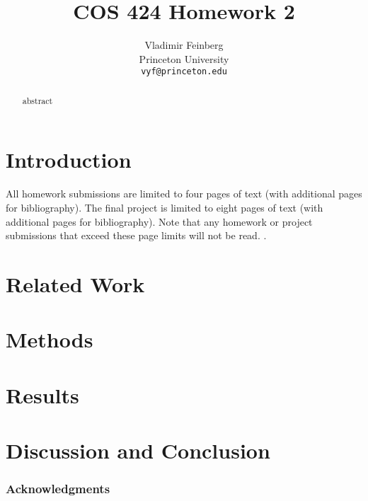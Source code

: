\documentclass{article} %
\title{COS 424 Homework 2}
\author{
Vladimir Feinberg\\
Princeton University\\
\texttt{vyf@princeton.edu}
}
\begin{document}
\maketitle

\begin{abstract}
abstract
\end{abstract}

\section{Introduction}

All homework submissions are limited to four pages of text (with additional pages for bibliography). The final project is limited to eight pages of text (with additional pages for bibliography). Note that any homework or project submissions that exceed these page limits will not be read. \cite{CJI10}.

\section{Related Work}

\section{Methods}

\section{Results}

\section{Discussion and Conclusion}

\subsubsection*{Acknowledgments}



\end{document}
